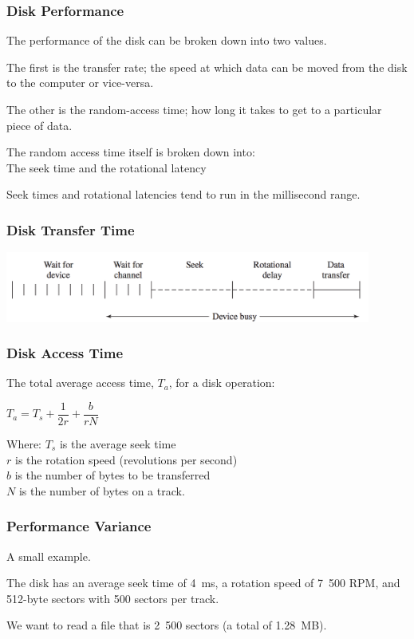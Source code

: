 \begin{frame}
\frametitle{Disk Performance}

The performance of the disk can be broken down into two values. 

The first is the \alert{transfer rate}; the speed at which data can be moved from the disk to the computer or vice-versa. 

The other is the \alert{random-access time}; how long it takes to get to a particular piece of data. 

The random access time itself is broken down into:\\
\quad The \alert{seek time} and the \alert{rotational latency}

Seek times and rotational latencies tend to run in the millisecond range.


\end{frame}

\begin{frame}
\frametitle{Disk Transfer Time}

\begin{center}
	\includegraphics[width=0.9\textwidth]{images/disk-transfer-time.png}
\end{center}


\end{frame}

\begin{frame}
\frametitle{Disk Access Time}

The total average access time, $T_{a}$, for a disk operation:

\begin{center}
$T_{a} = T_{s} + \dfrac{1}{2r} + \dfrac{b}{rN}$
\end{center}

Where: $T_{s}$ is the average seek time\\
\quad $r$ is the rotation speed (revolutions per second)\\
\quad $b$ is the number of bytes to be transferred\\ 
\quad $N$ is the number of bytes on a track.


\end{frame}

\begin{frame}
\frametitle{Performance Variance}

A small example.

The disk has an average seek time of 4~ms, a rotation speed of 7~500 RPM, and 512-byte sectors with 500 sectors per track. 

We want to read a file that is 2~500 sectors (a total of 1.28~MB). 

\end{frame}

